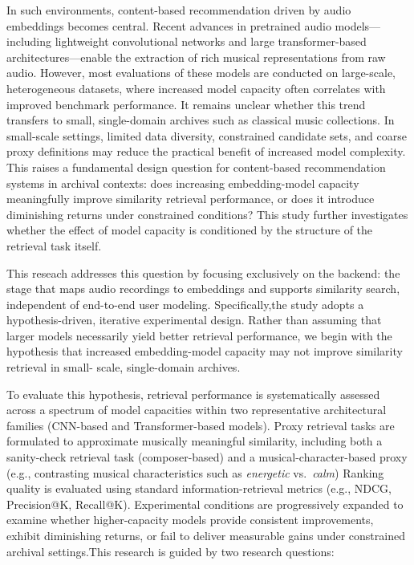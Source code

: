 \documentclass{article}
\begin{document}
In such environments, content-based recommendation driven by audio embeddings becomes central.
Recent advances in pretrained audio models---including lightweight convolutional networks and large
transformer-based architectures---enable the extraction of rich musical representations from raw
audio.
However, most evaluations of these models are conducted on large-scale, heterogeneous datasets, where
increased model capacity often correlates with improved benchmark performance.
It remains unclear whether this trend transfers to small, single-domain archives such as classical
music collections.
In small-scale settings, limited data diversity, constrained candidate sets, and coarse proxy
definitions may reduce the practical benefit of increased model complexity.
This raises a fundamental design question for content-based recommendation systems in archival
contexts: does increasing embedding-model capacity meaningfully improve similarity retrieval
performance, or does it introduce diminishing returns under constrained conditions?
This study further investigates whether the effect of model capacity is conditioned 
by the structure of the retrieval task itself.

This reseach addresses this question by focusing exclusively on the backend: the stage that maps audio
recordings to embeddings and supports similarity search, independent of end-to-end user modeling.
Specifically,the study adopts a hypothesis-driven, iterative experimental design.
Rather than assuming that larger models necessarily yield better retrieval performance, we begin with
the hypothesis that increased embedding-model capacity may not improve similarity retrieval in small-
scale, single-domain archives.

To evaluate this hypothesis, retrieval performance is systematically assessed across a spectrum of
model capacities within two representative architectural families (CNN-based and Transformer-based
models).
Proxy retrieval tasks are formulated to approximate musically meaningful similarity, including both a
sanity-check retrieval task (composer-based) and a musical-character-based proxy (e.g., contrasting musical characteristics such as \emph{energetic} vs.\ \emph{calm})
Ranking quality is evaluated using standard information-retrieval metrics (e.g., NDCG, Precision@K, Recall@K).
Experimental conditions are progressively expanded to examine whether higher-capacity models provide
consistent improvements, exhibit diminishing returns, or fail to deliver measurable gains under
constrained archival settings.This research is guided by two research questions:
\end{document}
